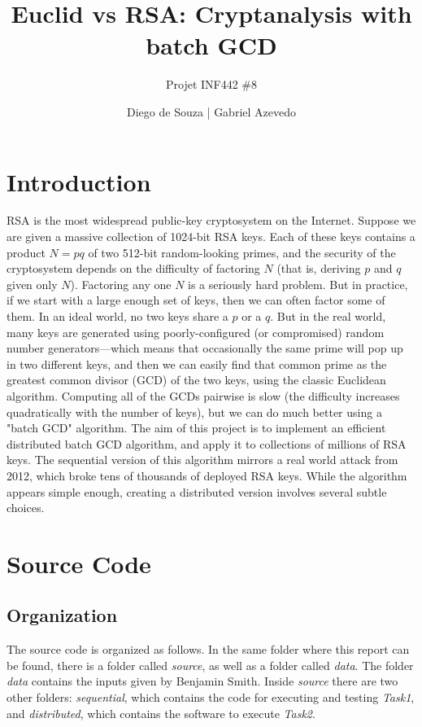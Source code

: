 \documentclass[a4paper,12pt]{article}
\title{\vspace{-4em} Euclid vs RSA: Cryptanalysis with batch GCD}
\subtitle{Projet INF442 \#8}
\author{ \large
Diego de Souza | Gabriel Azevedo\\
\vspace{1em}
}
\date{}
\begin{document}
\maketitle
\newpage


\renewcommand*\contentsname{\hfill Sommaire \hfill}

\pagestyle{plain}
\tableofcontents

\newpage

\pagestyle{plain}

\section{Introduction}
RSA is the most widespread public-key cryptosystem on the Internet. Suppose we are given a massive collection of 1024-bit RSA keys. Each of these keys contains a product $N = pq$ of two 512-bit random-looking primes, and the security of the cryptosystem depends on the difficulty of factoring $N$ (that is, deriving $p$ and $q$ given only $N$).
Factoring any one $N$ is a seriously hard problem. But in practice, if we start with a large enough set of
keys, then we can often factor some of them. In an ideal world, no two keys share a $p$ or a $q$. But in
the real world, many keys are generated using poorly-configured (or compromised) random number
generators—which means that occasionally the same prime will pop up in two different keys, and
then we can easily find that common prime as the greatest common divisor (GCD) of the two keys,
using the classic Euclidean algorithm. Computing all of the GCDs pairwise is slow (the difficulty
increases quadratically with the number of keys), but we can do much better using a "batch GCD"
algorithm. The aim of this project is to implement an efficient distributed batch GCD algorithm, and
apply it to collections of millions of RSA keys. The sequential version of this algorithm mirrors a real world attack from 2012, which broke tens of thousands of deployed RSA keys. While
the algorithm appears simple enough, creating a distributed version involves several subtle choices.


\section{Source Code}

\subsection{Organization}
The source code is organized as follows. In the same folder where this report can be found, there is a folder called \textit{source}, as well as a folder called \textit{data}. The folder \textit{data} contains the inputs given by Benjamin Smith. Inside \textit{source} there are two other folders: \textit{sequential}, which contains the code for executing and testing \textit{Task1}, and \textit{distributed}, which contains the software to execute \textit{Task2}.
\end{document}
